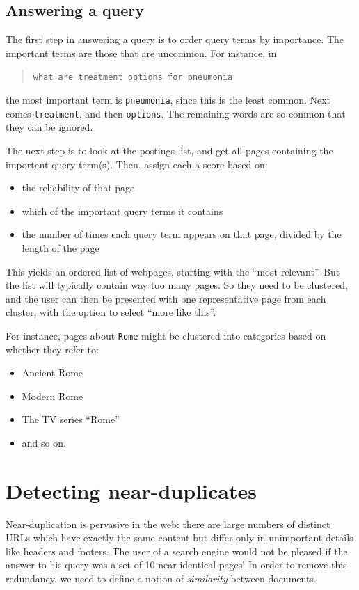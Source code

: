 \subsection{Answering a query}

The first step in answering a query is to order query terms by importance. The important terms are those that are uncommon. For instance, in
\begin{quote}
{\tt what are treatment options for pneumonia}
\end{quote}
the most important term is {\tt pneumonia}, since this is the least common. Next comes {\tt treatment}, and then {\tt options}. The remaining words are so common that they can be ignored.

The next step is to look at the postings list, and get all pages containing the important query term(s). Then, assign each a score based on:
\begin{itemize}
\item the reliability of that page
\item which of the important query terms it contains
\item the number of times each query term appears on that page, divided by the length of the page
\end{itemize}

This yields an ordered list of webpages, starting with the ``most relevant''. But the list will typically contain way too many pages. So they need to be clustered, and the user can then be presented with one representative page from each cluster, with the option to select ``more like this''.

For instance, pages about {\tt Rome} might be clustered into categories based on whether they refer to:
\begin{itemize}
\item Ancient Rome
\item Modern Rome
\item The TV series ``Rome''
\item and so on.
\end{itemize}

\section{Detecting near-duplicates}

Near-duplication is pervasive in the web: there are large numbers of distinct URLs which have exactly
the same content but differ only in unimportant details like headers and footers. The user of a search
engine would not be pleased if the answer to his query was a set of 10 near-identical pages! In order
to remove this redundancy, we need to define a notion of {\it similarity} between documents.

